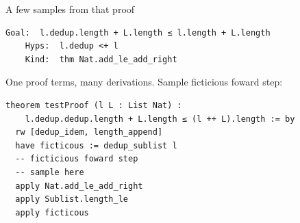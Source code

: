 \documentclass[aspectratio=169]{beamer}
\begin{document}
\begin{frame}[fragile]{A few samples from that proof}
\begin{lstlisting}[basicstyle=\ttfamily\small]
	Goal:  l.dedup.length + L.length ≤ l.length + L.length
	Hyps:  l.dedup <+ l
	Kind:  thm Nat.add_le_add_right
\end{lstlisting}
One proof terms, many derivations. Sample ficticious foward step:
\begin{lstlisting}
theorem testProof (l L : List Nat) :
	l.dedup.dedup.length + L.length ≤ (l ++ L).length := by
  rw [dedup_idem, length_append]
  have ficticous := dedup_sublist l
  -- ficticious foward step
  -- sample here
  apply Nat.add_le_add_right
  apply Sublist.length_le
  apply ficticous
\end{lstlisting}
\end{frame}

\end{document}
